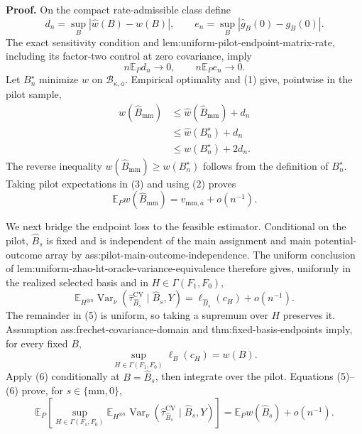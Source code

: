 \textbf{Proof.}
On the compact rate-admissible class define
\[
d_n=\sup_B|\widehat w(B)-w(B)|,
\qquad
e_n=\sup_B|\widehat g_B(0)-g_B(0)|.
\tag{1}
\]
The exact sensitivity condition and lem:uniform-pilot-endpoint-matrix-rate, including its factor-two control at zero covariance, imply
\[
n\mathbb E_Pd_n\longrightarrow0,
\qquad
n\mathbb E_Pe_n\longrightarrow0.
\tag{2}
\]
Let \(B_n^\star\) minimize \(w\) on \(\mathcal B_{\kappa,\overline a}\).  Empirical optimality and (1) give, pointwise in the pilot sample,
\[
\begin{aligned}
w(\widehat B_{\mathrm{mm}})
&\le\widehat w(\widehat B_{\mathrm{mm}})+d_n\\
&\le\widehat w(B_n^\star)+d_n\\
&\le w(B_n^\star)+2d_n.
\end{aligned}
\tag{3}
\]
The reverse inequality \(w(\widehat B_{\mathrm{mm}})\ge w(B_n^\star)\) follows from the definition of \(B_n^\star\).  Taking pilot expectations in (3) and using (2) proves
\[
\mathbb E_Pw(\widehat B_{\mathrm{mm}})
=v_{\mathrm{mm},\overline a}+o(n^{-1}).
\tag{4}
\]

We next bridge the endpoint loss to the feasible estimator.  Conditional on the pilot, \(\widehat B_s\) is fixed and is independent of the main assignment and main potential-outcome array by ass:pilot-main-outcome-independence.  The uniform conclusion of lem:uniform-zhao-ht-oracle-variance-equivalence therefore gives, uniformly in the realized selected basis and in \(H\in\Gamma(F_1,F_0)\),
\[
\mathbb E_{H^{\otimes n}}
\operatorname{Var}_\nu
(\widehat\tau_{\widehat B_s}^{\mathrm{CV}}
\mid\widehat B_s,Y)
=\ell_{\widehat B_s}(c_H)+o(n^{-1}).
\tag{5}
\]
The remainder in (5) is uniform, so taking a supremum over \(H\) preserves it.  Assumption ass:frechet-covariance-domain and thm:fixed-basis-endpoints imply, for every fixed \(B\),
\[
\sup_{H\in\Gamma(F_1,F_0)}\ell_B(c_H)=w(B).
\tag{6}
\]
Apply (6) conditionally at \(B=\widehat B_s\), then integrate over the pilot.  Equations (5)--(6) prove, for \(s\in\{\mathrm{mm},0\}\),
\[
\mathbb E_P\left[
\sup_{H\in\Gamma(F_1,F_0)}
\mathbb E_{H^{\otimes n}}
\operatorname{Var}_\nu
(\widehat\tau_{\widehat B_s}^{\mathrm{CV}}
\mid\widehat B_s,Y)
\right]
=\mathbb E_Pw(\widehat B_s)+o(n^{-1}).
\tag{7}
\]


